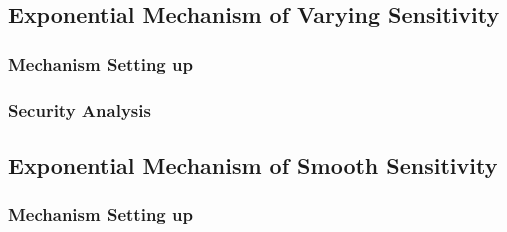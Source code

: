 \documentclass{article}
\begin{document}


\subsection{Exponential Mechanism of Varying Sensitivity}
\label{subsec_emvs}
\subsubsection{Mechanism Setting up}

\subsubsection{Security Analysis}

\subsection{Exponential Mechanism of Smooth Sensitivity}
\label{subsec_emss}
\subsubsection{Mechanism Setting up}
\end{document}
